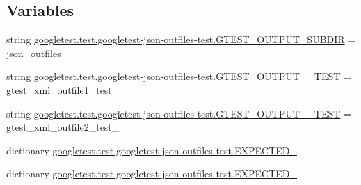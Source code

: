 \subsection*{Variables}
\begin{DoxyCompactItemize}
\item 
string \mbox{\hyperlink{namespacegoogletest_1_1test_1_1googletest-json-outfiles-test_a2b934ba218db4ed72501cdb88d57bc05}{googletest.\+test.\+googletest-\/json-\/outfiles-\/test.\+G\+T\+E\+S\+T\+\_\+\+O\+U\+T\+P\+U\+T\+\_\+\+S\+U\+B\+D\+IR}} = \textquotesingle{}json\+\_\+outfiles\textquotesingle{}
\item 
string \mbox{\hyperlink{namespacegoogletest_1_1test_1_1googletest-json-outfiles-test_a4d234140f7efaeec58690050b12238fa}{googletest.\+test.\+googletest-\/json-\/outfiles-\/test.\+G\+T\+E\+S\+T\+\_\+\+O\+U\+T\+P\+U\+T\+\_\+\_\+\+T\+E\+ST}} = \textquotesingle{}gtest\+\_\+xml\+\_\+outfile1\+\_\+test\+\_\+\textquotesingle{}
\item 
string \mbox{\hyperlink{namespacegoogletest_1_1test_1_1googletest-json-outfiles-test_adf9b46aebfc54e6cb305c48dd6caf3da}{googletest.\+test.\+googletest-\/json-\/outfiles-\/test.\+G\+T\+E\+S\+T\+\_\+\+O\+U\+T\+P\+U\+T\+\_\+\_\+\+T\+E\+ST}} = \textquotesingle{}gtest\+\_\+xml\+\_\+outfile2\+\_\+test\+\_\+\textquotesingle{}
\item 
dictionary \mbox{\hyperlink{namespacegoogletest_1_1test_1_1googletest-json-outfiles-test_aa849cc5380c24313fe0dd95b85df05b0}{googletest.\+test.\+googletest-\/json-\/outfiles-\/test.\+E\+X\+P\+E\+C\+T\+E\+D\+\_}}
\item 
dictionary \mbox{\hyperlink{namespacegoogletest_1_1test_1_1googletest-json-outfiles-test_a7ca68d2c17ef378a1f6415dd9e85bae1}{googletest.\+test.\+googletest-\/json-\/outfiles-\/test.\+E\+X\+P\+E\+C\+T\+E\+D\+\_}}
\end{DoxyCompactItemize}

